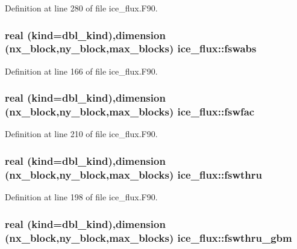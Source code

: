 Definition at line 280 of file ice\_\-flux.F90.\hypertarget{namespaceice__flux_af3384816a4840e4df4c79f158e6e9762}{
\subsubsection[{fswabs}]{\setlength{\rightskip}{0pt plus 5cm}real (kind=dbl\_\-kind),dimension (nx\_\-block,ny\_\-block,max\_\-blocks) {\bf ice\_\-flux::fswabs}}}
\label{namespaceice__flux_af3384816a4840e4df4c79f158e6e9762}


Definition at line 166 of file ice\_\-flux.F90.\hypertarget{namespaceice__flux_a848ade46ff78dbaa4ff31b24abd7bd3c}{
\subsubsection[{fswfac}]{\setlength{\rightskip}{0pt plus 5cm}real (kind=dbl\_\-kind),dimension (nx\_\-block,ny\_\-block,max\_\-blocks) {\bf ice\_\-flux::fswfac}}}
\label{namespaceice__flux_a848ade46ff78dbaa4ff31b24abd7bd3c}


Definition at line 210 of file ice\_\-flux.F90.\hypertarget{namespaceice__flux_a2b935c4127f16509133036f6cf544794}{
\subsubsection[{fswthru}]{\setlength{\rightskip}{0pt plus 5cm}real (kind=dbl\_\-kind),dimension (nx\_\-block,ny\_\-block,max\_\-blocks) {\bf ice\_\-flux::fswthru}}}
\label{namespaceice__flux_a2b935c4127f16509133036f6cf544794}


Definition at line 198 of file ice\_\-flux.F90.\hypertarget{namespaceice__flux_ac9af65dc6cf70d6aed3b1eafc170c7a4}{
\subsubsection[{fswthru\_\-gbm}]{\setlength{\rightskip}{0pt plus 5cm}real (kind=dbl\_\-kind),dimension (nx\_\-block,ny\_\-block,max\_\-blocks) {\bf ice\_\-flux::fswthru\_\-gbm}}}
\label{namespaceice__flux_ac9af65dc6cf70d6aed3b1eafc170c7a4}



